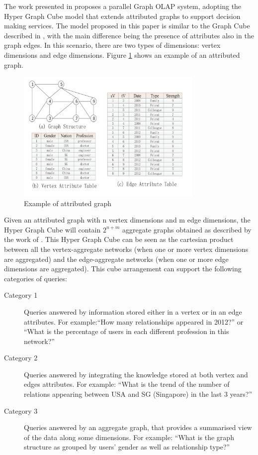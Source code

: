The work presented in \cite{Wang2014} proposes a parallel Graph OLAP system, adopting the Hyper Graph Cube model that extends attributed graphs to support decision making services. The model proposed in this paper is similar to the Graph Cube described in \cite{Zhao2011}, with the main difference being the presence of attributes also in the graph edges. In this scenario, there are two types of dimensions: vertex dimensions and edge dimensions. Figure \ref{fig:figure20} shows an example of an attributed graph.

\begin{figure}[ht]
\centering
\includegraphics[width=0.8\textwidth]{../attributed_graph.png}
\caption{Example of attributed graph \cite{Wang2014}}
\label{fig:figure20}
\end{figure}

Given an attributed graph with n vertex dimensions and m edge dimensions, the Hyper Graph Cube will contain $2^{n+m}$ aggregate graphs obtained as described by the work of \cite{Zhao2011}. This Hyper Graph Cube can be seen as the cartesian product between all the vertex-aggregate networks (when one or more vertex dimensions are aggregated) and the edge-aggregate networks (when one or more edge dimensions are aggregated). This cube arrangement can support the following categories of queries:

\begin{description}
\item[Category 1] Queries answered by information stored either in a vertex or in an edge attributes. For example:``How many relationships appeared in 2012?'' or ``What is the percentage of users in each different profession in this network?''
\item[Category 2] Queries answered by integrating the knowledge stored at both vertex and edges attributes. For example: ``What is the trend of the number of relations appearing between USA and SG (Singapore) in the last 3 years?''
\item[Category 3] Queries answered by an aggregate graph, that provides a summarised view of the data along some dimensions. For example: ``What is the graph structure as grouped by users' gender as well as relationship type?''
\end{description}

